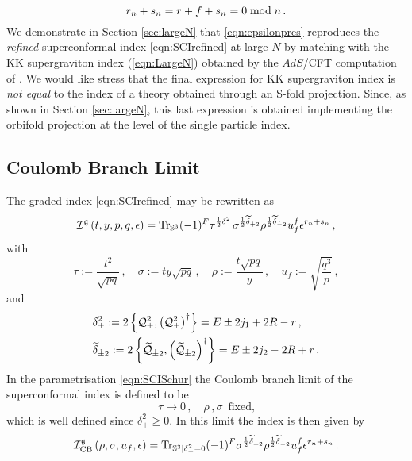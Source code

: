 \documentclass[main.tex]{subfiles}
\begin{document}
\begin{equation}
r_{n}+ s_{n}=r+f+ s_{n}=0\bmod {n}\,.
\end{equation}
We demonstrate in Section \ref{sec:largeN} that \eqref{eqn:epsilonpres} reproduces the {\it refined} superconformal index \eqref{eqn:SCIrefined} at large $N$ by matching with the KK supergraviton index (\ref{eqn:LargeN}) obtained by the $AdS$/CFT computation of \cite{Imamura:2016abe}. We would like stress that the final expression for KK supergraviton index is {\it not equal} to the index of a theory obtained through an S-fold projection. Since, as shown in Section \ref{sec:largeN}, this last expression is obtained implementing the orbifold projection at the level of the single particle index.

\subsection{Coulomb Branch Limit}
The graded index \eqref{eqn:SCIrefined} may be rewritten as \cite{Gadde:2011uv}
\begin{equation}\label{eqn:SCISchur}
\mathcal{I}^{\mathfrak{g}}\left(t,y,p,q,\epsilon\right)= \textrm{Tr}_{\mathbb{S}^3}(-1)^F\tau^{\frac{1}{2}\delta_+^2}\sigma^{\frac{1}{2}\widetilde{\delta}_{\dot+ 2}}\rho^{\frac{1}{2}\widetilde{\delta}_{\dot- 2}}u_f^f \epsilon^{r_{n}+ s_{n}}\, ,
\end{equation}
with
\begin{equation}
\tau:=\frac{t^2}{\sqrt{pq}}\,,\quad \sigma:=ty\sqrt{pq}\,,\quad \rho:=\frac{t\sqrt{pq}}{y}\,,\quad u_f:=\sqrt{\frac{q^3}{p}}\,,
\end{equation}
and
\begin{align}
&\delta_{\pm}^2:=2\left\{\mathcal{Q}_{\pm}^2,\left(\mathcal{Q}_{\pm}^2\right)^{\dagger}\right\}=E\pm2j_1+2R-r\,,\\
&\widetilde{\delta}_{\dot\pm 2}:=2\left\{\widetilde{\mathcal{Q}}_{\dot\pm 2},\left(\widetilde{\mathcal{Q}}_{\dot\pm 2}\right)^{\dagger}\right\}=E\pm2j_2-2R+r\,.
\end{align}
In the parametrisation \eqref{eqn:SCISchur} the Coulomb branch limit of the superconformal index is defined to be \cite{Gadde:2011uv}
\begin{equation}\label{eqn:CBlimit}
\tau\to0\,,\quad \rho\,,\sigma\,\text{ fixed,}
\end{equation}
which is well defined since $\delta_+^2\geq0$. In this limit the index is then given by
\begin{equation}\label{eqn:SCICB1}
\mathcal{I}^{\mathfrak{g}}_{\text{CB}}\left(\rho,\sigma,u_f,\epsilon\right)= \textrm{Tr}_{\mathbb{S}^3|\delta_+^2=0}(-1)^F\sigma^{\frac{1}{2}\widetilde{\delta}_{\dot+ 2}}\rho^{\frac{1}{2}\widetilde{\delta}_{\dot- 2}}u_f^f\epsilon^{r_{n}+ s_{n}}\,.
\end{equation}
\end{document}
